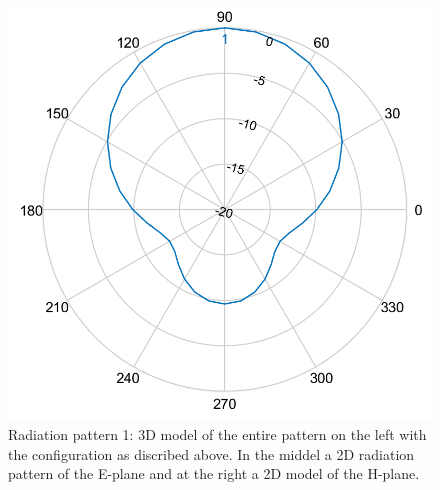 \begin{figure}[!htb]
  \includegraphics[width=\linewidth]{../images/pattern2/hp.png}
\endminipage
  \caption{Radiation pattern 1: 3D model of the entire pattern on the left with the configuration as discribed above. In the middel a 2D radiation pattern of the E-plane and at the right a 2D model of the H-plane.}
  \label{radpattern2}
\end{figure}

